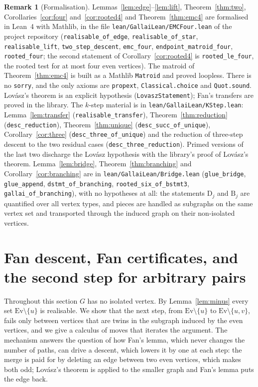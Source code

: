 \documentclass[11pt]{amsart}
\theoremstyle{definition}
\newtheorem{remark}[theorem]{Remark}
\newcommand{\Ev}{\mathrm{Ev}}
\begin{document}
\begin{remark}[Formalisation]\sloppy
Lemmas~\ref{lem:edge}--\ref{lem:lift}, Theorem~\ref{thm:two}, Corollaries~\ref{cor:four}
and~\ref{cor:rooted4} and Theorem~\ref{thm:emc4} are formalised in Lean~4 with Mathlib, in the file
\texttt{lean/GallaiLean/EMCFour.lean} of the project repository (\texttt{realisable\_of\_edge},
\texttt{realisable\_of\_star}, \texttt{realisable\_lift}, \texttt{two\_step\_descent},
\texttt{emc\_four}, \texttt{endpoint\_matroid\_four}, \texttt{rooted\_four}; the second statement of
Corollary~\ref{cor:rooted4} is \texttt{rooted\_le\_four}, the rooted test for at most four even
vertices). The matroid of
Theorem~\ref{thm:emc4} is built as a Mathlib \texttt{Matroid} and proved loopless. There is no
\texttt{sorry}, and the only axioms are \texttt{propext}, \texttt{Classical.choice} and
\texttt{Quot.sound}. Lov\'asz's theorem is an explicit hypothesis (\texttt{LovaszStatement}); Fan's
transfers are proved in the library. The $k$-step material is in \texttt{lean/GallaiLean/KStep.lean}:
Lemma~\ref{lem:transfer} (\texttt{realisable\_transfer}), Theorem~\ref{thm:reduction}
(\texttt{desc\_reduction}), Theorem~\ref{thm:unique} (\texttt{desc\_succ\_of\_unique}),
Corollary~\ref{cor:three} (\texttt{desc\_three\_of\_unique}) and the reduction of three-step descent
to the two residual cases (\texttt{desc\_three\_reduction}). Primed versions of the last two discharge
the Lov\'asz hypothesis with the library's proof of Lov\'asz's theorem. Lemma~\ref{lem:bridge},
Theorem~\ref{thm:branching} and Corollary~\ref{cor:branching} are in
\texttt{lean/GallaiLean/Bridge.lean} (\texttt{glue\_bridge}, \texttt{glue\_append},
\texttt{dstmt\_of\_branching}, \texttt{rooted\_six\_of\_bstmt3}, \texttt{gallai\_of\_branching}),
with no hypotheses at all: the statements $\mathrm{D}_j$ and $\mathrm{B}_j$ are quantified over all
vertex types, and pieces are handled as subgraphs on the same vertex set and transported through the
induced graph on their non-isolated vertices.
\end{remark}

\section{Fan descent, Fan certificates, and the second step for arbitrary pairs}\label{sec:second}

Throughout this section $G$ has no isolated vertex. By Lemma~\ref{lem:minus} every set
$\Ev\setminus\{u\}$ is realisable. We show that the next step, from $\Ev\setminus\{u\}$ to
$\Ev\setminus\{u,v\}$, fails only between vertices that are twins in the subgraph induced by the
even vertices, and we give a calculus of moves that iterates the argument. The mechanism answers
the question of how Fan's lemma, which never changes the number of paths, can drive a descent,
which lowers it by one at each step: the merge is paid for by deleting an edge between two even
vertices, which makes both odd; Lov\'asz's theorem is applied to the smaller graph and Fan's lemma
puts the edge back.
\end{document}
